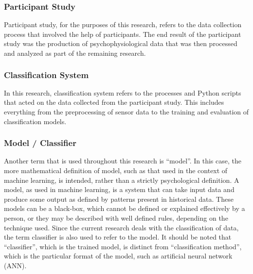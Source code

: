 \documentclass[11pt]{article}
\begin{document}
		\subsubsection{Participant Study}
		Participant study, for the purposes of this research, refers to the data collection process that involved the help of participants. The end result of the participant study was the production of psychophysiological data that was then processed and analyzed as part of the remaining research. 
		
		\subsubsection{Classification System}
		In this research, classification system refers to the processes and Python scripts that acted on the data collected from the participant study. This includes everything from the preprocessing of sensor data to the training and evaluation of classification models. 		
		
		\subsubsection{Model / Classifier}
		Another term that is used throughout this research is ``model''. In this case, the more mathematical definition of model, such as that used in the context of machine learning, is intended, rather than a strictly psychological definition. A model, as used in machine learning, is a system that can take input data and produce some output as defined by patterns present in historical data. These models can be a black-box, which cannot be defined or explained effectively by a person, or they may be described with well defined rules, depending on the technique used. Since the current research deals with the classification of data, the term classifier is also used to refer to the model. It should be noted that ``classifier'', which is the trained model, is distinct from ``classification method'', which is the particular format of the model, such as artificial neural network (ANN).
	
\end{document}
